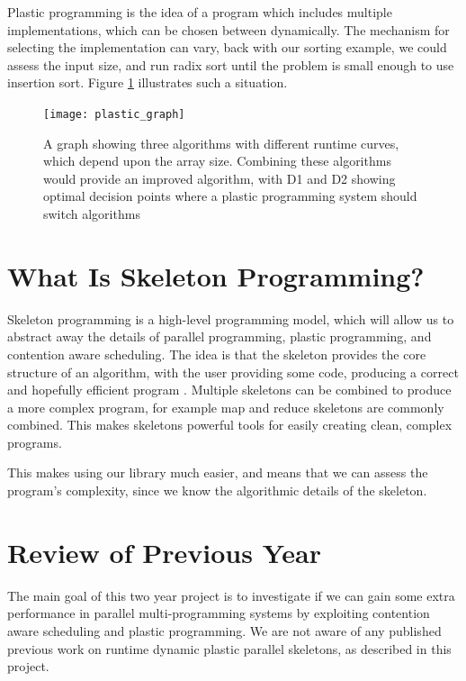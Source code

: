 Plastic programming is the idea of a program which includes multiple implementations, which can be chosen between dynamically. The mechanism for selecting the implementation can vary, back with our sorting example, we could assess the input size, and run radix sort until the problem is small enough to use insertion sort. Figure \ref{fig:plastic_graph} illustrates such a situation.

\begin{figure}[H]
	\centering
	\texttt{[image: plastic\_graph]}
	\caption{A graph showing three algorithms with different runtime curves, which depend upon the array size. Combining these algorithms would provide an improved algorithm, with D1 and D2 showing optimal decision points where a plastic programming system should switch algorithms}
	\label{fig:plastic_graph}
\end{figure}



\section{What Is Skeleton Programming?}
\label{section:background:what_is_skeleton_programming}

Skeleton programming is a high-level programming model, which will allow us to abstract away the details of parallel programming, plastic programming, and contention aware scheduling. The idea is that the skeleton provides the core structure of an algorithm, with the user providing some code, producing a correct and hopefully efficient program \cite{patterns_and_frameworks}. Multiple skeletons can be combined to produce a more complex program, for example map and reduce skeletons are commonly combined. This makes skeletons powerful tools for easily creating clean, complex programs.

This makes using our library much easier, and means that we can assess the program's complexity, since we know the algorithmic details of the skeleton.



\section{Review of Previous Year}
\label{section:background:review_of_previous_year}

The main goal of this two year project is to investigate if we can gain some extra performance in parallel multi-programming systems by exploiting contention aware scheduling and plastic programming. We are not aware of any published previous work on runtime dynamic plastic parallel skeletons, as described in this project.

